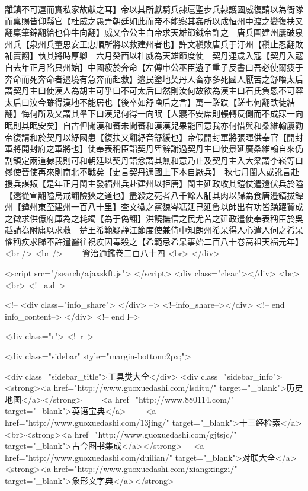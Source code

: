 離鎮不可運而實私家故獻之耳】帝以其所獻騎兵隸扈聖步兵隸護國威復請以為衙隊而稟賜皆仰縣官【杜威之愚弄朝廷如此而帝不能察其姦所以成恒州中渡之變復扶又翻稟筆錦翻給也仰牛向翻】威又令公主白帝求天雄節鉞帝許之　唐兵圍建州屢破泉州兵【泉州兵董思安王忠順所將以救建州者也】許文稹敗唐兵于汀州【稹止忍翻敗補賣翻】執其將時厚卿　六月癸酉以杜威為天雄節度使　契丹連歲入寇【契丹入寇自去年正月陷貝州始】中國疲於奔命【左傳申公巫臣遺子重子反書曰吾必使爾疲于奔命而死奔命者邉境有急奔而赴救】邉民塗地契丹人畜亦多死國人厭苦之舒嚕太后謂契丹主曰使漢人為胡主可乎曰不可太后曰然則汝何故欲為漢主曰石氏負恩不可容太后曰汝今雖得漢地不能居也【後卒如舒嚕后之言】萬一蹉跌【蹉七何翻跌徒結翻】悔何所及又謂其羣下曰漢兒何得一向眠【人寢不安席則輾轉反側而不成寐一向眠則其眠安矣】自古但聞漢和蕃未聞蕃和漢漢兒果能回意我亦何惜與和桑維翰屢勸帝復請和於契丹以紓國患【復扶又翻紓音舒緩也】帝假開封軍將張暉供奉官【開封軍將開封府之軍將也】使奉表稱臣詣契丹卑辭謝過契丹主曰使景延廣桑維翰自來仍割鎮定兩道隸我則可和朝廷以契丹語忿謂其無和意乃止及契丹主入大梁謂李崧等曰曏使晉使再來則南北不戰矣【史言契丹通國上下本自厭兵】　秋七月閩人或訛言赴援兵謀叛【是年正月閩主發福州兵赴建州以拒唐】閩主延政收其鎧仗遣還伏兵於隘【還從宣翻隘烏戒翻險狹之道也】盡殺之死者八千餘人脯其肉以歸為食唐邉鎬拔鐔州【鐔州東至建州一百八十里】查文徽之黨魏岑馮延己延魯以師出有功皆踴躍贊成之徵求供億府庫為之耗竭【為于偽翻】洪饒撫信之民尤苦之延政遣使奉表稱臣於吳越請為附庸以求救　楚王希範疑静江節度使兼侍中知朗州希杲得人心遣人伺之希杲懼稱疾求歸不許遣醫往視疾因毒殺之【希範忌希杲事始二百八十卷高祖天福元年】<br />
<br />
　　資治通鑑卷二百八十四  <br>
   </div> 

<script src="/search/ajaxskft.js"> </script>
 <div class="clear"></div>
<br>
<br>
 <!-- a.d-->

 <!--
<div class="info_share">
</div> 
-->
 <!--info_share--></div>   <!-- end info_content-->
  </div> <!-- end l-->

<div class="r">   <!--r-->



<div class="sidebar"  style="margin-bottom:2px;">

 
<div class="sidebar_title">工具类大全</div>
<div class="sidebar_info">
<strong><a href="http://www.guoxuedashi.com/lsditu/" target="_blank">历史地图</a></strong>　　
<a href="http://www.880114.com/" target="_blank">英语宝典</a>　　
<a href="http://www.guoxuedashi.com/13jing/" target="_blank">十三经检索</a>　
<br><strong><a href="http://www.guoxuedashi.com/gjtsjc/" target="_blank">古今图书集成</a></strong>　
<a href="http://www.guoxuedashi.com/duilian/" target="_blank">对联大全</a>　<strong><a href="http://www.guoxuedashi.com/xiangxingzi/" target="_blank">象形文字典</a></strong>　

